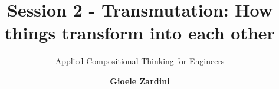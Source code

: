 \title{Session 2 - Transmutation: How things transform into each other}

\subtitle{Applied Compositional Thinking for Engineers}

\date{}

\author[Applied Compositional Thinking for Engineers]
{
    \textbf{Gioele Zardini}
}

\institute[ETHZ]
{
    \begin{center}
    \end{center}
}

